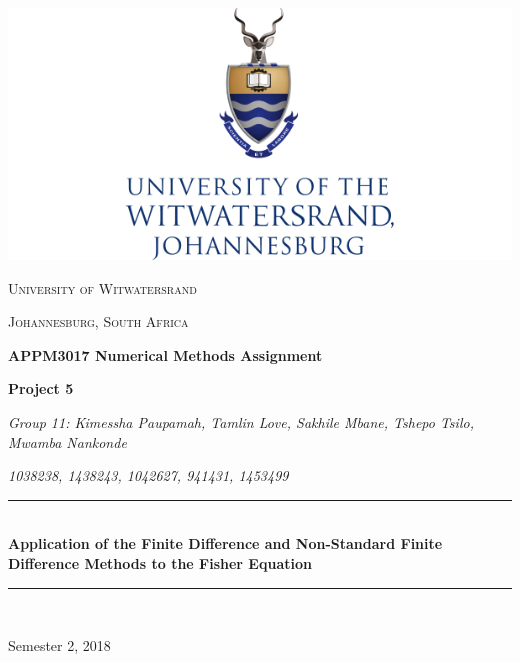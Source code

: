 \documentclass[a4paper]{article}
\author{Group 11: Kimessha Paupamah, Tamlin Love, Sakhile Mbane, Tshepo Tsilo, Mwamba Nankonde }
\date{\today}
\begin{document}
\begin{titlepage}
	\centering
	
\includegraphics[scale=0.55]{index.png}
	\vspace{0.5cm}
	
\newcommand{\HRule}{\rule{\linewidth}{0.5mm}} 

{\scshape\Large University of Witwatersrand\par}
{\scshape\Large Johannesburg, South Africa\par}
	\vspace{1cm}
	{\huge\bfseries APPM3017 Numerical Methods Assignment \par}
	\vspace{0.5cm}
	{\Large\bfseries Project 5 \par}
	\vspace{0.5cm}
	{\Large\itshape Group 11: Kimessha Paupamah, Tamlin Love, Sakhile Mbane, Tshepo Tsilo, Mwamba Nankonde\par}
	\vspace{0.5cm}
	{\Large\itshape 1038238, 1438243, 1042627, 941431, 1453499\par}
	\vfill
	
\HRule \\[0.4cm]
{ \huge \bfseries Application of the Finite Difference and Non-Standard Finite Difference Methods to the Fisher Equation}\\[0.4cm] 
\HRule \\[1.5cm]

	{\large Semester 2, 2018\par}

\end{titlepage}

\begin{abstract}

We investigate the performance of two numerical schemes - the Explicit Finite Difference and Non-Standard Finite Difference - in solving the Fisher Equation $\frac{\partial u}{\partial t} = \frac{\partial^2 u}{\partial x^2} + \rho u(1-u)$, a Reaction-Diffusion class PDE used in a number of biological, ecological and chemical models. We model the two schemes for varying step sizes in $x$ and $t$ and compare each to the exact analytical solution, $\frac{1}{(\exp{(\sqrt{\frac{\rho}{6}}x-\frac{5\rho}{6}t)}+1)^2}$. We conclude that the Non-Standard scheme is overall more robust than the Finite Difference scheme, given its performance with large $\Delta x$ and $\Delta t$ values.
\end{abstract}
\end{document}

